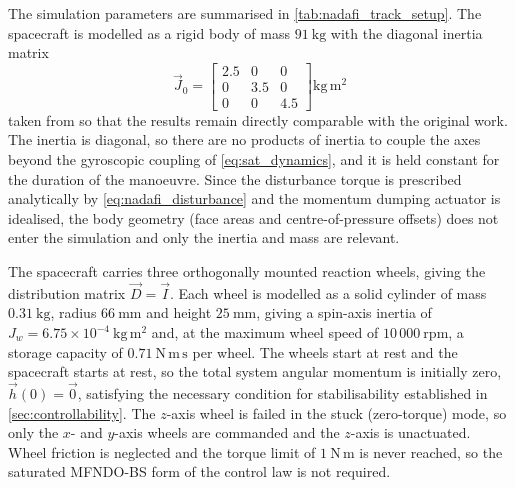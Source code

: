 The simulation parameters are summarised in \autoref{tab:nadafi_track_setup}. The spacecraft is modelled as a rigid body of mass $91\ \mathrm{kg}$ with the diagonal inertia matrix
\begin{equation}
    \vec{J}_0 = \begin{bmatrix}
        2.5 & 0   & 0 \\
        0   & 3.5 & 0 \\
        0   & 0   & 4.5
    \end{bmatrix} \mathrm{kg\,m^2}
    \label{eq:nadafi_inertia}
\end{equation}
taken from \cite{nadafiRobustBacksteppingAttitude2021} so that the results remain directly comparable with the original work. The inertia is diagonal, so there are no products of inertia to couple the axes beyond the gyroscopic coupling of \autoref{eq:sat_dynamics}, and it is held constant for the duration of the manoeuvre. Since the disturbance torque is prescribed analytically by \autoref{eq:nadafi_disturbance} and the momentum dumping actuator is idealised, the body geometry (face areas and centre-of-pressure offsets) does not enter the simulation and only the inertia and mass are relevant.

The spacecraft carries three orthogonally mounted reaction wheels, giving the distribution matrix $\vec{D} = \vec{I}$. Each wheel is modelled as a solid cylinder of mass $0.31\ \mathrm{kg}$, radius $66\ \mathrm{mm}$ and height $25\ \mathrm{mm}$, giving a spin-axis inertia of $J_w = 6.75\times10^{-4}\ \mathrm{kg\,m^2}$ and, at the maximum wheel speed of $10\,000\ \mathrm{rpm}$, a storage capacity of $0.71\ \mathrm{N\,m\,s}$ per wheel. The wheels start at rest and the spacecraft starts at rest, so the total system angular momentum is initially zero, $\vec{h}(0) = \vec{0}$, satisfying the necessary condition for stabilisability established in \autoref{sec:controllability}. The $z$-axis wheel is failed in the stuck (zero-torque) mode, so only the $x$- and $y$-axis wheels are commanded and the $z$-axis is unactuated. Wheel friction is neglected and the torque limit of $1\ \mathrm{N\,m}$ is never reached, so the saturated MFNDO-BS form of the control law is not required.

